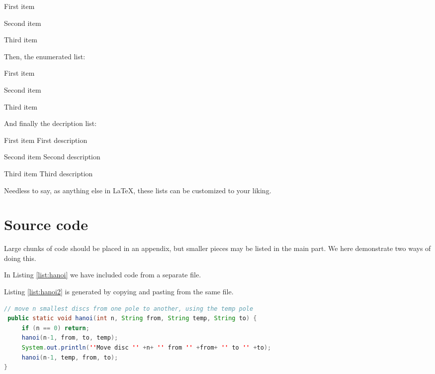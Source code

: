 \begin{compactitem}
\item First item
\item Second item
\item Third item
\end{compactitem}
Then, the enumerated list:
\begin{compactenum}
\item First item
\item Second item
\item Third item
\end{compactenum}
And finally the decription list:
\begin{compactdesc}
\item [First item] First description \lipsum[5]
\item [Second item] Second description
\item [Third item] Third description
\end{compactdesc}

Needless to say, as anything else in \LaTeX, these lists can be customized to your liking.

\section{Source code}
\label{sec:sourcecode} 

Large chunks of code should be placed in an appendix, but smaller pieces may be listed in the main part. We here demonstrate two ways of doing this.

In Listing \ref{list:hanoi} we have included code from a separate file.



Listing \ref{list:hanoi2} is generated by copying and pasting from the same file.

\begin{lstlisting}[caption=Core of the recursive solution of Towers of Hanoi,label=list:hanoi2,language=Java,float=htpb]
// move n smallest discs from one pole to another, using the temp pole
 public static void hanoi(int n, String from, String temp, String to) {
     if (n == 0) return;
     hanoi(n-1, from, to, temp);
     System.out.println(''Move disc '' +n+ '' from '' +from+ '' to '' +to);
     hanoi(n-1, temp, from, to);
}
\end{lstlisting}

